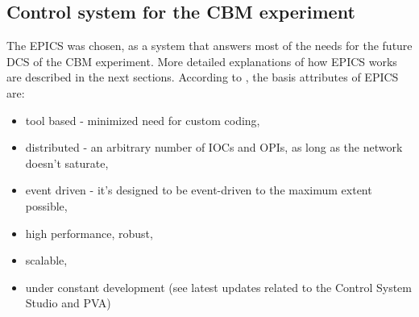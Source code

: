 



\subsection{Control system for the CBM experiment}
The \gls{EPICS} was chosen, as a system that answers most of the needs for the future \gls{DCS} of the \gls{CBM} experiment. More detailed explanations of how \gls{EPICS} works are described in the next sections. According to \cite{EPICS_DOCS}, the basis attributes of \gls{EPICS} are:
\begin{itemize}
    \item tool based - minimized need for custom coding,
    \item distributed - an arbitrary number of \glspl{IOC} and \glspl{OPI}, as long as the network doesn't saturate,
    \item event driven - it's designed to be event-driven to the maximum extent possible,
    \item high performance, robust,
    \item scalable,
    \item under constant development (see latest updates related to the Control System Studio and PVA)
\end{itemize}

